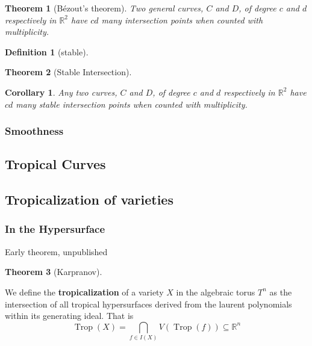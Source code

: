 \documentclass[12pt,a4paper]{amsart}
\newcommand{\trop}[1]{\operatorname{Trop}(#1)}
\newcommand{\R}{\mathbb{R}}
\newtheorem{thm}{Theorem}[section]
\newtheorem{cor}{Corollary}[thm]
\theoremstyle{definition}
\newtheorem{defn}{Definition}[section]
\theoremstyle{remark}
\begin{document}

\begin{thm}[Bézout's theorem]
Two general curves, $C$ and $D$, of degree $c$ and $d$ respectively in $\R^2$ have $c d$ many intersection points when counted with multiplicity.
\end{thm}

\begin{defn}[stable]

\end{defn}

\begin{thm}[Stable Intersection]

\end{thm}

\begin{cor}
Any two curves, $C$ and $D$, of degree $c$ and $d$ respectively in $\R^2$ have $c d$ many stable intersection points when counted with multiplicity.
\end{cor}

\subsubsection{Smoothness}

\subsection{Tropical Curves}

\subsection{Tropicalization of varieties}

\subsubsection{In the Hypersurface}

Early theorem, unpublished

\begin{thm}[Karpranov]

\end{thm}

We define the \textbf{tropicalization} of a variety $X$ in the algebraic torus $T^n$ as the intersection of all tropical hypersurfaces derived from the laurent polynomials within its generating ideal. That is
\begin{equation}
    \trop{X} = \bigcap_{f\in I(X)} V(\trop{f}) \subseteq \R^n
\end{equation}
\end{document}
